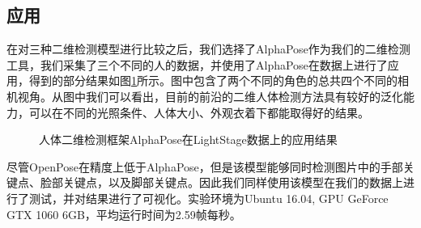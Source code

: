 
\subsection{应用}
在对三种二维检测模型进行比较之后，我们选择了AlphaPose作为我们的二维检测工具，我们采集了三个不同的人的数据，并使用了AlphaPose在数据上进行了应用，得到的部分结果如图\ref{fig:ls2d}所示。图中包含了两个不同的角色的总共四个不同的相机视角。从图中我们可以看出，目前的前沿的二维人体检测方法具有较好的泛化能力，可以在不同的光照条件、人体大小、外观衣着下都能取得好的结果。

\begin{figure}[htbp]
    \centering
    \caption{人体二维检测框架AlphaPose在LightStage数据上的应用结果\label{fig:ls2d}}
\end{figure}

尽管OpenPose在精度上低于AlphaPose，但是该模型能够同时检测图片中的手部关键点、脸部关键点，以及脚部关键点。因此我们同样使用该模型在我们的数据上进行了测试，并对结果进行了可视化。实验环境为Ubuntu 16.04, GPU GeForce GTX 1060 6GB，平均运行时间为2.59帧每秒。

